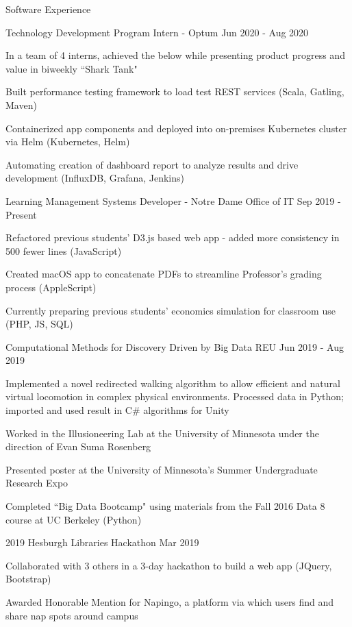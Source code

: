\documentclass[10pt]{resume} %
\begin{document}
\begin{rSection}{ Software Experience }

\begin{rSubsection}{ Technology Development Program Intern - Optum }{ Jun 2020 - Aug 2020 }{}{}
\item In a team of 4 interns, achieved the below while presenting product progress and value in biweekly ``Shark Tank"
\item Built performance testing framework to load test REST services (Scala, Gatling, Maven)
\item Containerized app components and deployed into on-premises Kubernetes cluster via Helm (Kubernetes, Helm)
\item Automating creation of dashboard report to analyze results and drive development (InfluxDB, Grafana, Jenkins)
\end{rSubsection}

\begin{rSubsection}{ Learning Management Systems Developer - Notre Dame Office of IT }{ Sep 2019 - Present }{}{}
\item Refactored previous students' D3.js based web app - added more consistency in 500 fewer lines (JavaScript)
\item Created macOS app to concatenate PDFs to streamline Professor's grading process (AppleScript)
\item Currently preparing previous students' economics simulation for classroom use (PHP, JS, SQL)
\end{rSubsection}

\begin{rSubsection}{ Computational Methods for Discovery Driven by Big Data REU }{ Jun 2019 - Aug 2019 }{}{}
\item Implemented a novel redirected walking algorithm to allow efficient and natural virtual locomotion in complex physical environments. Processed data in Python; imported and used result in C\# algorithms for Unity
\item Worked in the Illusioneering Lab at the University of Minnesota under the direction of Evan Suma Rosenberg
\item Presented poster at the University of Minnesota's Summer Undergraduate Research Expo
\item Completed ``Big Data Bootcamp" using materials from the Fall 2016 Data 8 course at UC Berkeley (Python)
\end{rSubsection}

\begin{rSubsection}{ 2019 Hesburgh Libraries Hackathon }{ Mar 2019 }{}{}
\item Collaborated with 3 others in a 3-day hackathon to build a web app (JQuery, Bootstrap)
\item Awarded Honorable Mention for Napingo, a platform via which users find and share nap spots around campus
\end{rSubsection}


\end{rSection}
\end{document}
